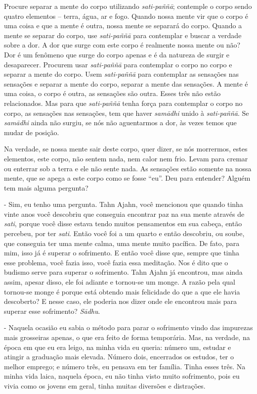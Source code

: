 Procure separar a mente do corpo utilizando \textit{sati-paññā};
contemple o corpo sendo quatro elementos – terra, água, ar e fogo.
Quando nossa mente vir que o corpo é uma coisa e que a mente é outra,
nossa mente se separará do corpo. Quando a mente se separar do corpo,
use \textit{sati-paññā }para contemplar e buscar a verdade sobre a
dor. A dor que surge com este corpo é realmente nossa mente ou não? Dor
é um fenômeno que surge do corpo apenas e é da natureza de surgir e
desaparecer. Procurem usar \textit{sati-paññā }para contemplar o
corpo no corpo e separar a mente do corpo. Usem \textit{sati-paññā
}para contemplar as sensações nas sensações e separar a mente do corpo,
separar a mente das sensações. A mente é uma coisa, o corpo é outra, as
sensações são outra. Esses três não estão relacionados. Mas para que
\textit{sati-paññā }tenha força para contemplar o corpo no corpo, as
sensações nas sensações, tem que haver \textit{samādhi }unido à
\textit{sati-paññā}. Se \textit{samādhi }ainda não surgiu, se nós
não aguentarmos a dor, às vezes temos que mudar de posição.

Na verdade, se nossa mente sair deste corpo, quer dizer, se nós
morrermos, estes elementos, este corpo, não sentem nada, nem calor nem
frio. Levam para cremar ou enterrar sob a terra e ele não sente nada.
As sensações estão somente na nossa mente, que se apega a este corpo
como se fosse “eu”. Deu para entender? Alguém tem mais alguma pergunta?

- Sim, eu tenho uma pergunta. Tahn Ajahn, você mencionou que
quando tinha vinte anos você descobriu que conseguia encontrar paz na
sua mente através de \textit{sati}, porque você disse estava tendo
muitos pensamentos em sua cabeça, então percebeu, por ter
\textit{sati}. Então você foi a um quarto e então descobriu, ou soube,
que conseguia ter uma mente calma, uma mente muito pacífica. De fato,
para mim, isso já é superar o sofrimento. E então você disse que,
sempre que tinha esse problema, você fazia isso, você fazia essa
meditação. Nos é dito que o budismo serve para superar o sofrimento.
Tahn Ajahn já encontrou, mas ainda assim, apesar disso, ele
foi adiante e tornou-se um monge. A razão pela qual tornou-se monge é
porque está obtendo mais felicidade do que a que ele havia descoberto?
E nesse caso, ele poderia nos dizer onde ele encontrou mais para
superar esse sofrimento? \textit{Sādhu}.

- Naquela ocasião eu sabia o método para parar o sofrimento vindo
das impurezas mais grosseiras apenas, o que era feito de forma
temporária. Mas, na verdade, na época em que eu era leigo, na minha
vida eu queria: número um, estudar e atingir a graduação mais elevada.
Número dois, encerrados os estudos, ter o melhor emprego; e número
três, eu pensava em ter família. Tinha esses três. Na minha vida laica,
naquela época, eu não tinha visto muito sofrimento, pois eu vivia como
os jovens em geral, tinha muitas diversões e distrações.

